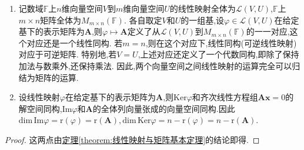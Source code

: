\documentclass[../../main.tex]{subfiles}%
\begin{document}
\begin{corollary}\label{corollary:线性映射与矩阵基本结论}
\begin{enumerate}[(1)]
\item\label{线性映射与矩阵基本结论1} 记数域\(\mathbb{F}\)上\(n\)维向量空间\(V\)到\(m\)维向量空间\(U\)的线性映射全体为\(\mathcal{L}(V,U)\),\(\mathbb{F}\)上\(m\times n\)矩阵全体为\(M_{m\times n}(\mathbb{F})\). 各自取定\(V\)和\(U\)的一组基,设\(\varphi\in\mathcal{L}(V,U)\)在给定基下的表示矩阵为\(\boldsymbol{A}\),则\(\varphi\mapsto\boldsymbol{A}\)定义了从\(\mathcal{L}(V,U)\)到\(M_{m\times n}(\mathbb{F})\)的一一对应,这个对应还是一个线性同构. 若\(m = n\),则在这个对应下,线性同构(可逆线性映射)对应于可逆矩阵. 特别地,若\(V = U\),上述对应还定义了一个代数同构,即除了保持加法与数乘外,还保持乘法. 因此,两个向量空间之间线性映射的运算完全可以归结为矩阵的运算.

\item\label{线性映射与矩阵基本结论2} 设线性映射\(\varphi\)在给定基下的表示矩阵为\(\boldsymbol{A}\),则\(\text{Ker}\varphi\)和齐次线性方程组\(\boldsymbol{A}\boldsymbol{x}=0\)的解空间同构,\(\text{Im}\varphi\)和\(\boldsymbol{A}\)的全体列向量张成的向量空间同构.因此$\mathrm{dim}\,\mathrm{Im}\varphi =\mathrm{r}\left( \varphi \right) =\mathrm{r}\left( \boldsymbol{A} \right) ,\mathrm{dim}\,\mathrm{Ker}\varphi =n-\mathrm{r}\left( \varphi \right) =n-\mathrm{r}\left( \boldsymbol{A} \right)$.
\end{enumerate}
\end{corollary}
\begin{proof}
这两点由\hyperref[theorem:线性映射与矩阵基本定理]{定理\ref{theorem:线性映射与矩阵基本定理}}的结论即得.
\end{proof}
\end{document}
